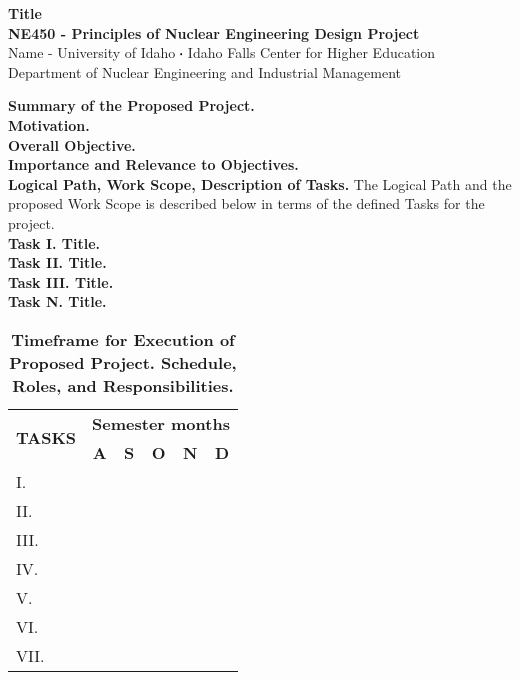 \documentclass[11pt,letterpaper]{article}
\newcommand*\sq{\mathbin{\vcenter{\hbox{\rule{.3ex}{.3ex}}}}} %
\begin{document}
{\centering 
    \textbf{Title\\
    NE450 - Principles of Nuclear Engineering Design Project\\
    }
    Name - University of Idaho $\sq$ Idaho Falls Center for Higher Education\\
    Department of Nuclear Engineering and Industrial Management
\par
}
\vspace{\baselineskip}

\noindent\textbf{Summary of the Proposed Project.} 
\\

\noindent\textbf{Motivation.}
\\

\noindent\textbf{Overall Objective.}
\\

\noindent\textbf{Importance and Relevance to Objectives.}
\\

\noindent\textbf{Logical Path, Work Scope, Description of Tasks.} The Logical Path and the proposed Work Scope is described below in terms of the defined Tasks for the project.
\\

\noindent\textbf{Task I. Title.}
\\

\noindent\textbf{Task II. Title.}
\\

\noindent\textbf{Task III. Title.}
\\

\noindent\textbf{Task N. Title.}
\\

\begin{table}[h!]
    \centering
    \caption*{\textbf{Timeframe for Execution of Proposed Project. Schedule, Roles, and Responsibilities.}}
    \begin{tabular}{|l|c|c|c|c|c|}
        \hline
        \multicolumn{1}{|c|}{\multirow{2}{*}{\textbf{TASKS}}}& 
        \multicolumn{5}{|c|}{\textbf{Semester months}}\\
        \cline{2-6}
        &
        \textbf{A}& 
        \textbf{S}& 
        \textbf{O}& 
        \textbf{N}& 
        \textbf{D}\\
        \hline
        I. & & & & & \\
        \hline
        II. & & & & & \\
        \hline
        III. & & & & & \\
        \hline
        IV. & & & & &  \\
        \hline
        V. & & & & &  \\
        \hline
        VI. & & & & & \\
        \hline
        VII. & & & & & \\
        \hline
    \end{tabular}
    \label{tab-timeframe}
\end{table}
\end{document}
